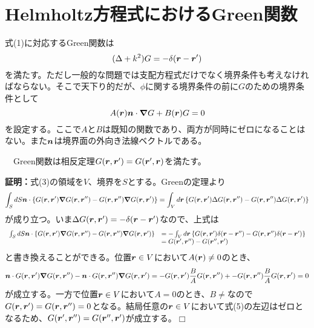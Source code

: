 \documentclass[dvipdfmx, 9pt, a4paper]{jsarticle}
\newcommand{\bm}[1]{{\mbox{\boldmath $#1$}}}
\newcommand{\bnabla}{\bm \nabla}
\def\qed{\hfill $\Box$}
\begin{document}
\section{Helmholtz方程式におけるGreen関数}
式(1)に対応するGreen関数は
\begin{equation}
(\Delta+k^2)G=-\delta(\bm r-\bm r')
\end{equation}
を満たす。ただし一般的な問題では支配方程式だけでなく境界条件も考えなければならない。そこで天下り的だが、$\phi$に関する境界条件の前に$G$のための境界条件として
\begin{equation}
A(\bm r)\bm n\cdot \bm \nabla G+B(\bm r)G=0
\end{equation}
を設定する。ここで$A$と$B$は既知の関数であり、両方が同時にゼロになることはない。また$\bm n$は境界面の外向き法線ベクトルである。
\begin{tcolorbox}[title=命題1.1：相反定理]
　Green関数は相反定理$G(\bm r, \bm r')=G(\bm r', \bm r)$を満たす。
\end{tcolorbox}
{\bf 証明：}式(3)の領域を$V$、境界を$S$とする。Greenの定理より
\begin{equation}
\int_S dS \bm n \cdot \left\{ G(\bm r, \bm r')\bnabla G(\bm r, \bm r'')-G(\bm r, \bm r'')\bnabla G(\bm r, \bm r') \right\}=\int_V d\bm r\left\{ G(\bm r, \bm r')\Delta G(\bm r, \bm r'')-G(\bm r, \bm r'')\Delta G(\bm r, \bm r') \right\} \notag
\end{equation}
が成り立つ。いま$\Delta G(\bm r, \bm r')=-\delta(\bm r-\bm r')$なので、上式は
\begin{equation}
\begin{array}{ll}
\int_S dS \bm n \cdot \left\{ G(\bm r, \bm r')\bnabla G(\bm r, \bm r'')-G(\bm r, \bm r'')\bnabla G(\bm r, \bm r') \right\} & =-\int_V d\bm r\left\{ G(\bm r, \bm r')\delta(\bm r-\bm r'')-G(\bm r, \bm r'')\delta(\bm r-\bm r') \right\} \\
 & = G(\bm r', \bm r'')-G(\bm r'', \bm r') 
\end{array}
\end{equation}
と書き換えることができる。位置$\bm r \in V$において$A(\bm r) \neq 0$のとき、
\begin{equation}
\bm n \cdot G(\bm r, \bm r')\bnabla G(\bm r, \bm r'')-\bm n \cdot G(\bm r, \bm r'')\bnabla G(\bm r, \bm r')=-G(\bm r, \bm r')\frac{B}{A}G(\bm r, \bm r'')+-G(\bm r, \bm r'')\frac{B}{A}G(\bm r, \bm r')=0\notag
\end{equation}
が成立する。一方で位置$\bm r \in V$において$A=0$のとき、$B \neq$なので$G(\bm r, \bm r')=G(\bm r, \bm r'')=0$となる。結局任意の$\bm r \in V$において式(5)の左辺はゼロとなるため、$G(\bm r', \bm r'')=G(\bm r'', \bm r')$が成立する。\qed
\end{document}
